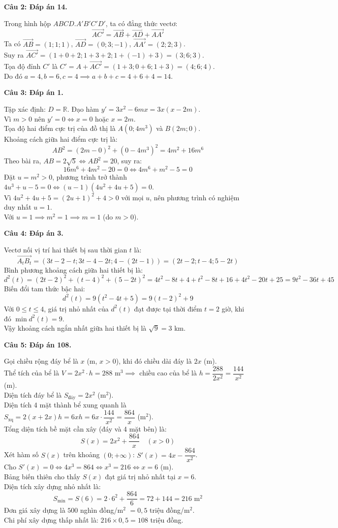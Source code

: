 \documentclass[12pt,a4paper]{article}
\newcommand{\loigiai}[1]{\par\medskip\Needspace{4\baselineskip}\noindent\textbf{#1}\par\nobreak}
\begin{document}
\loigiai{Câu 2: Đáp án 14.}
Trong hình hộp $ABCD.A'B'C'D'$, ta có đẳng thức vectơ:
\[ \overrightarrow{AC'}=\overrightarrow{AB}+\overrightarrow{AD}+\overrightarrow{AA'} \]
Ta có $\overrightarrow{AB}=(1;1;1)$, $\overrightarrow{AD}=(0;3;-1)$, $\overrightarrow{AA'}=(2;2;3)$.\\
Suy ra $\overrightarrow{AC'}=(1+0+2;1+3+2;1+(-1)+3)=(3;6;3)$.\\
Tọa độ đỉnh $C'$ là $C'=A+\overrightarrow{AC'}=(1+3;0+6;1+3)=(4;6;4)$.\\
Do đó $a=4,b=6,c=4\implies a+b+c=4+6+4=14$.

\loigiai{Câu 3: Đáp án 1.}
Tập xác định: $D=\mathbb R$. Đạo hàm $y'=3x^2-6mx=3x(x-2m)$.\\
Vì $m>0$ nên $y'=0\iff x=0$ hoặc $x=2m$.\\
Tọa độ hai điểm cực trị của đồ thị là $A(0;4m^3)$ và $B(2m;0)$.\\
Khoảng cách giữa hai điểm cực trị là:
\[ AB^2=(2m-0)^2+(0-4m^3)^2=4m^2+16m^6 \]
Theo bài ra, $AB=2\sqrt5\iff AB^2=20$, suy ra:
\[ 16m^6+4m^2-20=0\iff 4m^6+m^2-5=0 \]
Đặt $u=m^2>0$, phương trình trở thành $4u^3+u-5=0\iff (u-1)(4u^2+4u+5)=0$.\\
Vì $4u^2+4u+5=(2u+1)^2+4>0$ với mọi $u$, nên phương trình có nghiệm duy nhất $u=1$.\\
Với $u=1\implies m^2=1\implies m=1$ (do $m>0$).

\loigiai{Câu 4: Đáp án 3.}
Vectơ nối vị trí hai thiết bị sau thời gian $t$ là:
\[ \overrightarrow{A_tB_t}=(3t-2-t;3t-4-2t;4-(2t-1))=(2t-2;t-4;5-2t) \]
Bình phương khoảng cách giữa hai thiết bị là:
\[ d^2(t)=(2t-2)^2+(t-4)^2+(5-2t)^2=4t^2-8t+4+t^2-8t+16+4t^2-20t+25=9t^2-36t+45 \]
Biến đổi tam thức bậc hai:
\[ d^2(t)=9(t^2-4t+5)=9(t-2)^2+9 \]
Với $0\le t\le4$, giá trị nhỏ nhất của $d^2(t)$ đạt được tại thời điểm $t=2$ giờ, khi đó $\min d^2(t)=9$.\\
Vậy khoảng cách ngắn nhất giữa hai thiết bị là $\sqrt9=3$ km.

\loigiai{Câu 5: Đáp án 108.}
Gọi chiều rộng đáy bể là $x$ (m, $x>0$), khi đó chiều dài đáy là $2x$ (m).\\
Thể tích của bể là $V=2x^2\cdot h=288\text{ m}^3\implies$ chiều cao của bể là $h=\dfrac{288}{2x^2}=\dfrac{144}{x^2}$ (m).\\
Diện tích đáy bể là $S_{\text{đáy}}=2x^2$ (m$^2$).\\
Diện tích 4 mặt thành bể xung quanh là $S_{\text{xq}}=2(x+2x)h=6xh=6x\cdot\dfrac{144}{x^2}=\dfrac{864}{x}$ (m$^2$).\\
Tổng diện tích bề mặt cần xây (đáy và 4 mặt bên) là:
\[ S(x)=2x^2+\dfrac{864}{x}\quad (x>0) \]
Xét hàm số $S(x)$ trên khoảng $(0;+\infty)$: $S'(x)=4x-\dfrac{864}{x^2}$.\\
Cho $S'(x)=0\iff 4x^3=864\iff x^3=216\iff x=6$ (m).\\
Bảng biến thiên cho thấy $S(x)$ đạt giá trị nhỏ nhất tại $x=6$.\\
Diện tích xây dựng nhỏ nhất là:
\[ S_{\min}=S(6)=2\cdot6^2+\dfrac{864}{6}=72+144=216\text{ m}^2 \]
Đơn giá xây dựng là $500$ nghìn đồng/m$^2$ $= 0{,}5$ triệu đồng/m$^2$.\\
Chi phí xây dựng thấp nhất là: $216\times0{,}5=108$ triệu đồng.
\end{document}
